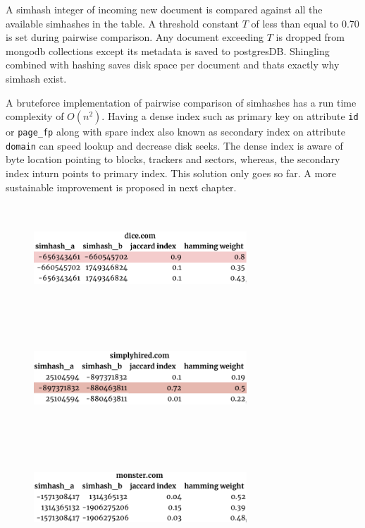 \noindent
A simhash integer of incoming new document is compared against all the available simhashes in the table.
A threshold constant $T$ of less than equal to 0.70 is set during pairwise comparison. 
Any document exceeding $T$ is dropped from mongodb collections except its metadata is saved to postgresDB.
Shingling combined with hashing saves disk space per document and thats exactly why simhash exist.

\pagebreak

\noindent
A bruteforce implementation of pairwise comparison of simhashes has a run time complexity of $O(n^2)$.
Having a dense index such as primary key on attribute \texttt{id} or \texttt{page\_fp} along with
spare index also known as secondary index on attribute \texttt{domain} can speed lookup and decrease disk seeks. The dense index is aware of byte location pointing to blocks, trackers and sectors, whereas, the secondary index inturn points to primary index. This solution only goes so far. A more sustainable improvement
is proposed in next chapter.

\begin{figure}[h!]
  \centering
  \includegraphics[width=8cm,height=4cm,keepaspectratio]{../media/crawler/dice.png}
  \label{fig:dice}
\end{figure}

\begin{figure}[h!]
  \centering
  \includegraphics[width=8cm,height=4cm,keepaspectratio]{../media/crawler/simplyhired.png}
  \label{fig:simhired}
\end{figure}

\begin{figure}[h!]
  \centering
  \includegraphics[width=8cm,height=4cm,keepaspectratio]{../media/crawler/monster.png}
  \label{fig:simhired}
\end{figure}

